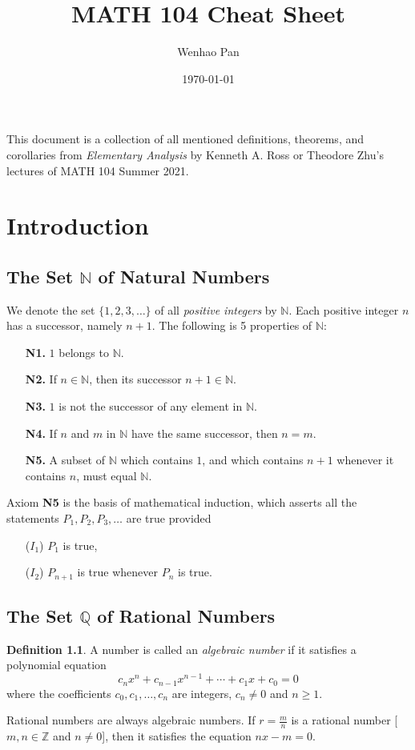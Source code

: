 \documentclass[12pt, lettersize]{book}
\title{MATH 104 Cheat Sheet}
\author{Wenhao Pan}
\date{\today}
\theoremstyle{plain}
\theoremstyle{definition}
\newtheorem{dfn}[thm]{Definition}
\theoremstyle{remark}
\newcommand{\N}{\mathbb{N}}
\newcommand{\Q}{\mathbb{Q}}
\newcommand{\Z}{\mathbb{Z}}
\begin{document}
	\maketitle
	
	This document is a collection of all mentioned definitions, theorems, and corollaries from \emph{Elementary Analysis} by Kenneth A. Ross or Theodore Zhu's lectures of MATH 104 Summer 2021.
	
	\tableofcontents
	
	\chapter{Introduction}
	\newpage
	\section{The Set $\N$ of Natural Numbers}
	We denote the set $\{1,2,3,\dots\}$ of all \emph{positive integers} by $\N$. Each positive integer $n$ has a successor, namely $n+1$. The following is 5 properties of $\N$:
	\begin{itemize}
		\item[\textbf{N1.}] $1$ belongs to $\N$.
		\item[\textbf{N2.}] If $n\in\N$, then its successor $n+1\in\N$.
		\item[\textbf{N3.}] $1$ is not the successor of any element in $\N$.
		\item[\textbf{N4.}] If $n$ and $m$ in $\N$ have the same successor, then $n=m$.
		\item[\textbf{N5.}] A subset of $\N$ which contains $1$, and which contains $n+1$ whenever it contains $n$, must equal $\N$.
	\end{itemize}
	Axiom \textbf{N5} is the basis of mathematical induction, which asserts all the statements $P_1,P_2,P_3,\dots$ are true provided
	\begin{itemize}
		\item[(\textbf{$I_1$})] $P_1$ is true,
		\item[(\textbf{$I_2$})] $P_{n+1}$ is true whenever $P_n$ is true.
	\end{itemize}
	\newpage
	\section{The Set $\Q$ of Rational Numbers}
	\begin{dfn}
		A number is called an \emph{algebraic number} if it satisfies a polynomial equation
		\begin{displaymath}
			c_nx^n+c_{n-1}x^{n-1}+\cdots+c_1x+c_0=0
		\end{displaymath}
		where the coefficients $c_0,c_1,\dots,c_n$ are integers, $c_n\neq0$ and $n\geq1$.
	\end{dfn}
	Rational numbers are always algebraic numbers. If $r=\frac{m}{n}$ is a rational number [$m,n\in\Z$ and $n\neq0$], then it satisfies the equation $nx-m=0$.
	
\end{document}
